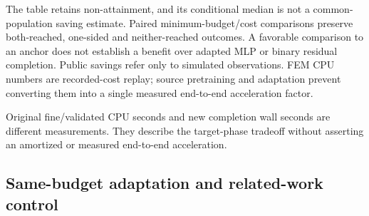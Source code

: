 \documentclass[10pt,twocolumn]{article}
\begin{document}
The table retains non-attainment, and its conditional median is not a common-population saving estimate. Paired minimum-budget/cost comparisons preserve both-reached, one-sided and neither-reached outcomes. A favorable comparison to an anchor does not establish a benefit over adapted MLP or binary residual completion. Public savings refer only to simulated observations. FEM CPU numbers are recorded-cost replay; source pretraining and adaptation prevent converting them into a single measured end-to-end acceleration factor.

\begin{table}[t]\centering\scriptsize{}\caption{Recorded characterization CPU work and measured completion wall time, reported separately.}\end{table}


Original fine/validated CPU seconds and new completion wall seconds are different measurements. They describe the target-phase tradeoff without asserting an amortized or measured end-to-end acceleration.

\subsection{Same-budget adaptation and related-work control}
\end{document}
